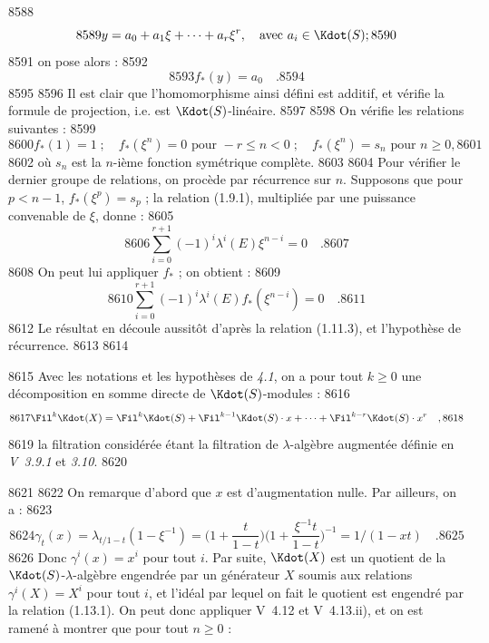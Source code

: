   8588	\begin{equation}\label{eq:5.2.1}
  8589	y = a_0 + a_1 \xi + \dots + a_r \xi^r, \quad \text{avec } a_i \in \Kdot(S) ;
  8590	\end{equation}
  8591	on pose alors :
  8592	\begin{equation}\label{eq:5.2.2}
  8593	f_{*}(y) = a_0 \quad .
  8594	\end{equation}
  8595	
  8596	Il est clair que l'homomorphisme ainsi d\'efini est additif, et v\'erifie la formule de projection, i.e. est $\Kdot(S)$-lin\'eaire.
  8597	
  8598	On v\'erifie les relations suivantes :
  8599	\begin{equation}\label{eq:5.2.3}
  8600	f_{*}(1) = 1 \; ; \quad f_{*}(\xi^n) = 0 \text{ pour } -r \leq n < 0 \; ; \quad f_{*}(\xi^n) = s_n \text{ pour } n \geq 0,
  8601	\end{equation}
  8602	o\`u $s_n$ est la $n$-i\`eme fonction sym\'etrique compl\`ete.
  8603	
  8604	Pour v\'erifier le dernier groupe de relations, on proc\`ede par r\'ecurrence sur $n$. Supposons que pour $p < n-1$, $f_{*}(\xi^p) = s_p$ ; la relation (1.9.1), multipli\'ee par une puissance convenable de $\xi$, donne :
  8605	\[
  8606	\sum_{i=0}^{r+1} (-1)^i \lambda^i(E) \xi^{n-i} = 0 \quad .
  8607	\]
  8608	On peut lui appliquer $f_{*}$ ; on obtient :
  8609	\[
  8610	\sum_{i=0}^{r+1} (-1)^i \lambda^i(E) f_{*}(\xi^{n-i}) = 0 \quad .
  8611	\]
  8612	Le r\'esultat en d\'ecoule aussit\^ot d'apr\`es la relation (1.11.3), et l'hypoth\`ese de r\'ecurrence.
  8613	
  8614	\begin{proposition}[5.3]
  8615	Avec les notations et les hypoth\`eses de \emph{4.1}, on a pour tout $k \geq 0$ une d\'ecomposition en somme directe de $\Kdot(S)$-modules :
  8616	\[
  8617	\Fil^k \Kdot(X) = \Fil^k \Kdot(S) + \Fil^{k-1}\Kdot(S) \cdot x + \dots + \Fil^{k-r}\Kdot(S) \cdot x^r \quad ,
  8618	\]
  8619	la filtration consid\'er\'ee \'etant la filtration de $\lambda$-alg\`ebre augment\'ee d\'efinie en \emph{V~3.9.1} et \emph{3.10}.
  8620	\end{proposition}
  8621	
  8622	On remarque d'abord que $x$ est d'augmentation nulle. Par ailleurs, on a :
  8623	\[
  8624	\gamma_t(x) = \lambda_{t/1-t}(1 - \xi^{-1}) = \bigl(1 + \frac{t}{1-t}\bigr) \bigl(1 + \frac{\xi^{-1}t}{1-t}\bigr)^{-1} = 1/(1 - xt) \quad .
  8625	\]
  8626	Donc $\gamma^i(x) = x^i$ pour tout $i$. Par suite, $\Kdot(X)$ est un quotient de la $\Kdot(S)$-$\lambda$-alg\`ebre engendr\'ee par un g\'en\'erateur $X$ soumis aux relations $\gamma^i(X) = X^i$ pour tout $i$, et l'id\'eal par lequel on fait le quotient est engendr\'e par la relation (1.13.1). On peut donc appliquer V~4.12 et V~4.13.ii), et on est ramen\'e \`a montrer que pour tout $n \geq 0$ :

